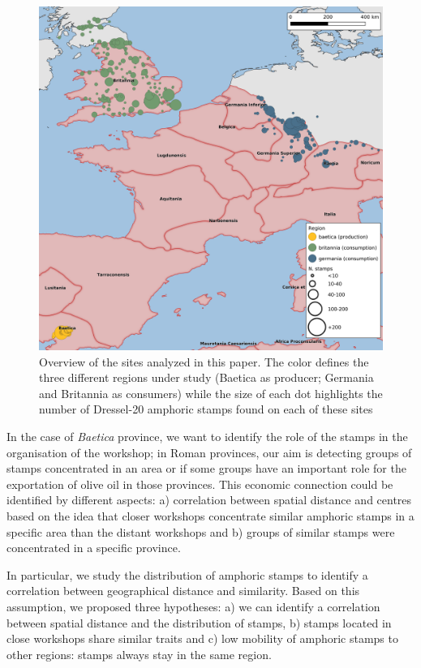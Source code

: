 \documentclass[review]{elsarticle}
\begin{document}
\begin{figure}[htp]
	\centering
\includegraphics[width=\linewidth]{figs/general_map}
\caption{Overview of the sites analyzed in this paper. The color defines the three different regions under study (Baetica as producer; Germania and Britannia as consumers) while the size of each dot highlights the number of Dressel-20 amphoric stamps found on each of these sites}

\label{general}
\end{figure} 
        
In the case of \textit{Baetica} province, we want to identify the role of the stamps in the organisation of the workshop; in Roman provinces, our aim is detecting groups of stamps concentrated in an area or if some groups have an important role for the exportation of olive oil in those provinces. This economic connection could be identified by different aspects: a) correlation between spatial distance and centres based on the idea that closer workshops concentrate similar amphoric stamps in a specific area than the distant workshops and b) groups of similar stamps were concentrated in a specific province. 

In particular, we study the distribution of amphoric stamps to identify a correlation between geographical distance and similarity. Based on this assumption, we proposed three hypotheses: a) we can identify a correlation between spatial distance and the distribution of stamps, b) stamps located in close workshops share similar traits and c) low mobility of amphoric stamps to other regions: stamps always stay in the same region. 
\end{document}
